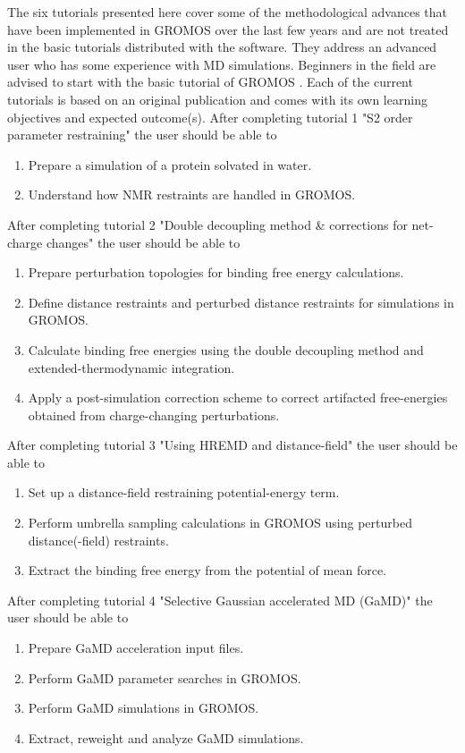 The six tutorials presented here cover some of the methodological advances that have been implemented in GROMOS over the last few years and are not treated in the basic tutorials distributed with the software. 
They address an advanced user who has some experience with MD simulations. Beginners in the field are advised to start with the basic tutorial of GROMOS \cite{volume_7}. Each of the current tutorials is based on an original publication and comes with its own learning objectives and expected outcome(s). 
After completing tutorial 1 "S2 order parameter restraining" the user should be able to
\begin{enumerate}
\item Prepare a simulation of a protein solvated in water.
\item Understand how NMR restraints are handled in GROMOS.
\end{enumerate}
%
After completing tutorial 2 "Double decoupling method \& corrections for net-charge changes" the user should be able to
\begin{enumerate}
\item Prepare perturbation topologies for binding free energy calculations.
\item Define distance restraints and perturbed distance restraints for simulations in GROMOS.
\item Calculate binding free energies using the double decoupling method and extended-thermodynamic integration.
\item Apply a post-simulation correction scheme to correct artifacted free-energies obtained from charge-changing perturbations.
\end{enumerate}
%
After completing tutorial 3 "Using HREMD and distance-field" the user should be able to
\begin{enumerate}
\item Set up a distance-field restraining potential-energy term.
\item Perform umbrella sampling calculations in GROMOS using perturbed distance(-field) restraints.
\item Extract the binding free energy from the potential of mean force.
\end{enumerate}
%
After completing tutorial 4 "Selective Gaussian accelerated MD (GaMD)" the user should be able to
\begin{enumerate}
\item Prepare GaMD acceleration input files.
\item Perform GaMD parameter searches in GROMOS.
\item Perform GaMD simulations in GROMOS.
\item Extract, reweight and analyze GaMD simulations.
\end{enumerate}
